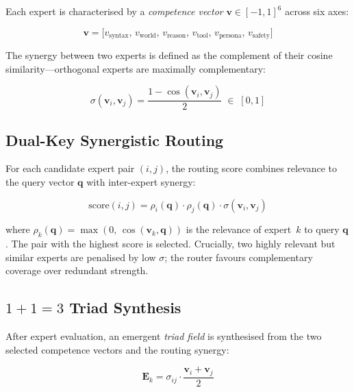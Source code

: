 \documentclass[journal,10pt,twocolumn]{IEEEtran}
\begin{document}
Each expert is characterised by a \emph{competence vector}
$\mathbf{v} \in [-1,1]^6$ across six axes:

\begin{equation}
  \mathbf{v} = \bigl[
    v_\text{syntax},\,
    v_\text{world},\,
    v_\text{reason},\,
    v_\text{tool},\,
    v_\text{persona},\,
    v_\text{safety}
  \bigr]
  \label{eq:competence}
\end{equation}

The synergy between two experts is defined as the complement of their cosine
similarity—orthogonal experts are maximally complementary:

\begin{equation}
  \sigma(\mathbf{v}_i, \mathbf{v}_j)
    = \frac{1 - \cos(\mathbf{v}_i, \mathbf{v}_j)}{2}
    \;\in\; [0, 1]
  \label{eq:synergy}
\end{equation}

\subsection{Dual-Key Synergistic Routing}

For each candidate expert pair $(i, j)$, the routing score combines
relevance to the query vector $\mathbf{q}$ with inter-expert synergy:

\begin{equation}
  \mathrm{score}(i, j)
    = \rho_i(\mathbf{q}) \cdot \rho_j(\mathbf{q}) \cdot \sigma(\mathbf{v}_i, \mathbf{v}_j)
  \label{eq:routing}
\end{equation}

where $\rho_k(\mathbf{q}) = \max(0,\, \cos(\mathbf{v}_k, \mathbf{q}))$
is the relevance of expert~$k$ to query $\mathbf{q}$. The pair with the
highest score is selected. Crucially, two highly relevant but similar
experts are penalised by low $\sigma$; the router favours complementary
coverage over redundant strength.

\subsection{$1{+}1{=}3$ Triad Synthesis}

After expert evaluation, an emergent \emph{triad field} is synthesised from
the two selected competence vectors and the routing synergy:

\begin{equation}
  \mathbf{E}_k = \sigma_{ij} \cdot \frac{\mathbf{v}_i + \mathbf{v}_j}{2}
  \label{eq:triad}
\end{equation}
\end{document}
